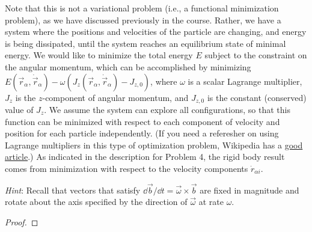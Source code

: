 \documentclass[../psets.tex]{subfiles}
\begin{document}
\begin{enumerate}
    Note that this is not a variational problem (i.e., a functional minimization problem), as we have discussed previously in the course. Rather, we have a system where the positions and velocities of the particle are changing, and energy is being dissipated, until the system reaches an equilibrium state of minimal energy. We would like to minimize the total energy $E$ subject to the constraint on the angular momentum, which can be accomplished by minimizing $E(\vec{r}_\alpha,\dot{\vec{r}}_\alpha)-\omega(J_z(\vec{r}_\alpha,\dot{\vec{r}}_\alpha)-J_{z,0})$, where $\omega$ is a scalar Lagrange multiplier, $J_z$ is the $z$-component of angular momentum, and $J_{z,0}$ is the constant (conserved) value of $J_z$. We assume the system can explore all configurations, so that this function can be minimized with respect to each component of velocity and position for each particle independently. (If you need a referesher on using Lagrange multipliers in this type of optimization problem, Wikipedia has a \href{https://en.wikipedia.org/wiki/Lagrange_multiplier}{good article}.) As indicated in the description for Problem 4, the rigid body result comes from minimization with respect to the velocity components $\dot{r}_{\alpha i}$.\par
    \emph{Hint}: Recall that vectors that satisfy $\dd{\vec{b}}/\dd{t}=\vec{\omega}\times\vec{b}$ are fixed in magnitude and rotate about the axis specified by the direction of $\vec{\omega}$ at rate $\omega$.
    \begin{proof}

        


\end{proof}
\end{enumerate}
\end{document}
